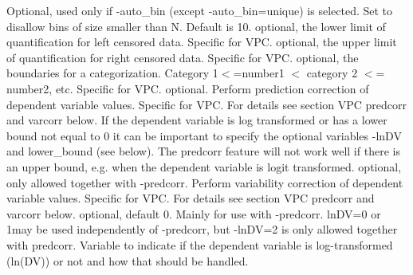 \begin{optionlist}
Optional, used only if -auto\_bin (except -auto\_bin=unique) is selected. Set to disallow bins of size smaller than N. Default is 10. 
\nextopt
{}
optional, the lower limit of quantification for left censored data. Specific for VPC. 
\nextopt
{}
optional, the upper limit of quantification for right censored data. Specific for VPC. 
\nextopt
{}
optional, the boundaries for a categorization. Category 1$<$=number1 $<$ category 2 $<$= number2, etc. Specific for VPC. 
\nextopt
{}
optional. Perform prediction correction of dependent variable values. Specific for VPC. For details see section VPC predcorr and varcorr below. If the dependent variable is log transformed or has a lower bound not equal to 0 it can be important to specify the optional variables -lnDV and lower\_bound (see below). The predcorr feature will not work well if there is an upper bound, e.g. when the dependent variable is logit transformed. 
\nextopt
{}
optional, only allowed together with -predcorr. Perform variability correction of dependent variable values. Specific for VPC. For details see section VPC predcorr and varcorr below. 
\nextopt
{}
optional, default 0. Mainly for use with -predcorr. lnDV=0 or 1may be used independently of -predcorr, but -lnDV=2 is only allowed together with predcorr. Variable to indicate if the dependent variable is log-transformed (ln(DV)) or not and how that should be handled.


\end{optionlist}
